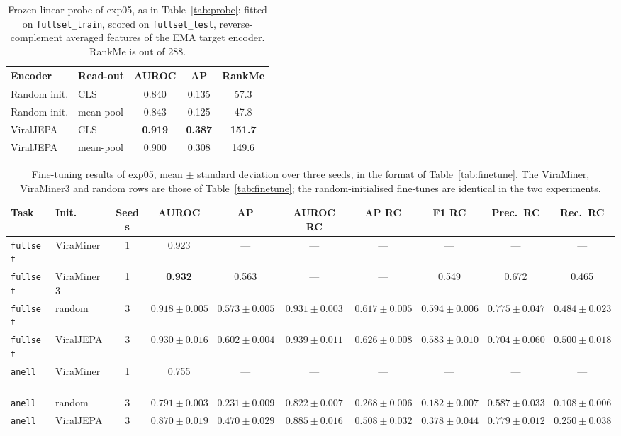 \documentclass[10pt,twocolumn,a4paper]{article}
\begin{document}
\begin{table}[t]
\centering
\caption{Frozen linear probe of exp05, as in Table~\ref{tab:probe}: fitted on
\texttt{fullset\_train}, scored on \texttt{fullset\_test}, reverse-complement
averaged features of the EMA target encoder. RankMe is out of 288.}
\label{tab:probe5}
\footnotesize
\setlength{\tabcolsep}{4pt}
\begin{tabular}{llccc}
\toprule
Encoder & Read-out & AUROC & AP & RankMe \\
\midrule
Random init. & CLS       & 0.840 & 0.135 & 57.3 \\
Random init. & mean-pool & 0.843 & 0.125 & 47.8 \\
ViralJEPA    & CLS       & \textbf{0.919} & \textbf{0.387} & \textbf{151.7} \\
ViralJEPA    & mean-pool & 0.900 & 0.308 & 149.6 \\
\bottomrule
\end{tabular}
\end{table}

\begin{table}[t]
\centering
\caption{Fine-tuning results of exp05, mean $\pm$ standard deviation over three
seeds, in the format of Table~\ref{tab:finetune}. The ViraMiner, ViraMiner3 and
random rows are those of Table~\ref{tab:finetune}; the random-initialised
fine-tunes are identical in the two experiments.}
\label{tab:finetune5}
\scriptsize
\setlength{\tabcolsep}{3.5pt}
\begin{tabular}{llcccccccc}
\toprule
Task & Init. & Seeds & AUROC & AP & AUROC RC & AP RC & F1 RC & Prec.\ RC & Rec.\ RC \\
\midrule
\texttt{fullset} & ViraMiner~\cite{tampuu2019viraminer} & 1 & 0.923 & --- & --- & --- & --- & --- & --- \\
\texttt{fullset} & ViraMiner3 & 1 & \textbf{0.932} & 0.563 & --- & --- & 0.549 & 0.672 & 0.465 \\
\texttt{fullset} & random     & 3 & $0.918\pm0.005$ & $0.573\pm0.005$ & $0.931\pm0.003$ & $0.617\pm0.005$ & $\mathbf{0.594\pm0.006}$ & $\mathbf{0.775\pm0.047}$ & $0.484\pm0.023$ \\
\texttt{fullset} & ViralJEPA  & 3 & $0.930\pm0.016$ & $\mathbf{0.602\pm0.004}$ & $\mathbf{0.939\pm0.011}$ & $\mathbf{0.626\pm0.008}$ & $0.583\pm0.010$ & $0.704\pm0.060$ & $\mathbf{0.500\pm0.018}$ \\
\midrule
\texttt{anell}   & ViraMiner~\cite{tampuu2019viraminer} & 1 & 0.755 & --- & --- & --- & --- & --- & --- \\
\texttt{anell}   & random     & 3 & $0.791\pm0.003$ & $0.231\pm0.009$ & $0.822\pm0.007$ & $0.268\pm0.006$ & $0.182\pm0.007$ & $0.587\pm0.033$ & $0.108\pm0.006$ \\
\texttt{anell}   & ViralJEPA  & 3 & $\mathbf{0.870\pm0.019}$ & $\mathbf{0.470\pm0.029}$ & $\mathbf{0.885\pm0.016}$ & $\mathbf{0.508\pm0.032}$ & $\mathbf{0.378\pm0.044}$ & $\mathbf{0.779\pm0.012}$ & $\mathbf{0.250\pm0.038}$ \\
\bottomrule
\end{tabular}
\end{table}
\end{document}
